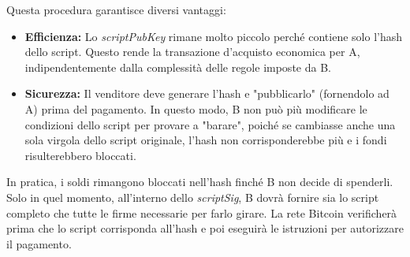 Questa procedura garantisce diversi vantaggi:
\begin{itemize}
    \item \textbf{Efficienza:} Lo \textit{scriptPubKey} rimane molto piccolo perché contiene solo l'hash dello script. Questo rende la transazione d'acquisto economica per A, indipendentemente dalla complessità delle regole imposte da B.
    \item \textbf{Sicurezza:} Il venditore deve generare l'hash e "pubblicarlo" (fornendolo ad A) prima del pagamento. In questo modo, B non può più modificare le condizioni dello script per provare a "barare", poiché se cambiasse anche una sola virgola dello script originale, l'hash non corrisponderebbe più e i fondi risulterebbero bloccati.
\end{itemize}

In pratica, i soldi rimangono bloccati nell'hash finché B non decide di spenderli. Solo in quel momento, all'interno dello \textit{scriptSig}, B dovrà fornire sia lo script completo che tutte le firme necessarie per farlo girare. La rete Bitcoin verificherà prima che lo script corrisponda all'hash e poi eseguirà le istruzioni per autorizzare il pagamento.
